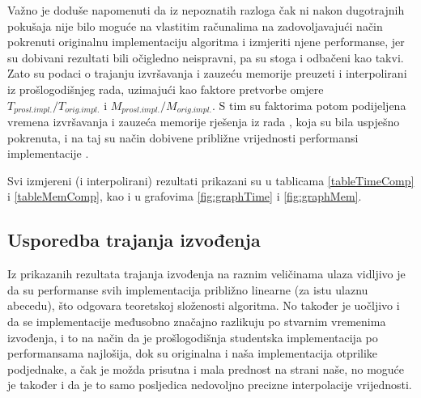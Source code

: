 \documentclass[a4paper,12pt]{article}
\begin{document}
Važno je doduše napomenuti da iz nepoznatih razloga čak ni nakon dugotrajnih pokušaja nije bilo moguće na vlastitim računalima na zadovoljavajući način pokrenuti originalnu implementaciju algoritma i izmjeriti njene performanse, jer su dobivani rezultati bili očigledno neispravni, pa su stoga i odbačeni kao takvi. Zato su podaci o trajanju izvršavanja i zauzeću memorije preuzeti i interpolirani iz prošlogodišnjeg rada, uzimajući kao faktore pretvorbe omjere $T_{prosl.impl.}/T_{orig.impl.}$ i $M_{prosl.impl.}/M_{orig.impl.}$. S tim su faktorima potom podijeljena vremena izvršavanja i zauzeća memorije rješenja iz rada \cite{studenti2017}, koja su bila uspješno pokrenuta, i na taj su način dobivene približne vrijednosti performansi implementacije \cite{beller2013}.

Svi izmjereni (i interpolirani) rezultati prikazani su u tablicama \ref{tableTimeComp} i \ref{tableMemComp}, kao i u grafovima \ref{fig:graphTime} i \ref{fig:graphMem}.

\subsection{Usporedba trajanja izvođenja}

Iz prikazanih rezultata trajanja izvođenja na raznim veličinama ulaza vidljivo je da su performanse svih implementacija približno linearne (za istu ulaznu abecedu), što odgovara teoretskoj složenosti algoritma. No također je uočljivo i da se implementacije međusobno značajno razlikuju po stvarnim vremenima izvođenja, i to na način da je prošlogodišnja studentska implementacija po performansama najlošija, dok su originalna i naša implementacija otprilike podjednake, a čak je možda prisutna i mala prednost na strani naše, no moguće je također i da je to samo posljedica nedovoljno precizne interpolacije vrijednosti.
\end{document}

